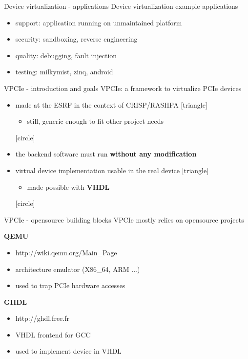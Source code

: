 \documentclass{beamer}
\begin{document}
\begin{frame}{Device virtualization - applications}
  Device virtualization example applications
  \begin{itemize}
  \item support: application running on unmaintained platform
  \item security: sandboxing, reverse engineering
  \item quality: debugging, fault injection
  \item testing: milkymist, zinq, android
  \end{itemize}
\end{frame}

\begin{frame}{VPCIe - introduction and goals}
  VPCIe: a framework to virtualize PCIe devices
  \begin{itemize}
  \item made at the ESRF in the context of CRISP/RASHPA
    [triangle]
    \begin{itemize}
    \item still, generic enough to fit other project needs
    \end{itemize}
    [circle]
  \item the backend software must run \textbf{without any modification}
  \item virtual device implementation usable in the real device
    [triangle]
    \begin{itemize}
    \item made possible with \textbf{VHDL}
    \end{itemize}
    [circle]
  \end{itemize}
\end{frame}

\begin{frame}{VPCIe - opensource building blocks}
  VPCIe mostly relies on opensource projects
  \newline

  \textbf{QEMU}
  \begin{itemize}
  \item http://wiki.qemu.org/Main\_Page
  \item architecture emulator (X86\_64, ARM ...)
  \item used to trap PCIe hardware accesses
  \end{itemize}

  \textbf{GHDL}
  \begin{itemize}
  \item http://ghdl.free.fr
  \item VHDL frontend for GCC
  \item used to implement device in VHDL
  \end{itemize}

\end{frame}
\end{document}
